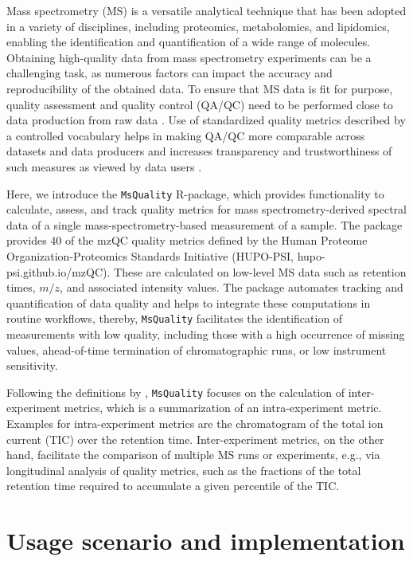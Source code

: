 \documentclass{bioinfo}
\begin{document}
Mass spectrometry (MS) is a versatile analytical technique that has been adopted
in a variety of disciplines, including proteomics, metabolomics, and lipidomics, 
enabling the identification and quantification of a wide range of molecules. 
Obtaining high-quality data from mass spectrometry experiments can be a 
challenging task, as numerous factors can impact the accuracy and 
reproducibility of the obtained data. To ensure that MS data is fit for purpose, 
quality assessment and quality control (QA/QC) need to be performed close
to data production from raw data \citep{Koecher2011,Bereman2015}. Use of standardized 
quality metrics described by a controlled vocabulary helps in making QA/QC more 
comparable across datasets and data producers and increases transparency and 
trustworthiness of such measures as viewed by data users 
\citep{Mayer2012,Mayer2013}.

Here, we introduce the \texttt{MsQuality} R-package, which provides 
functionality to calculate, assess, and track quality metrics for mass 
spectrometry-derived spectral data of a single mass-spectrometry-based 
measurement of a sample. 
The package provides 40 of the mzQC quality metrics defined by
the Human Proteome Organization-Proteomics Standards Initiative (HUPO-PSI,
hupo-psi.github.io/mzQC). These are calculated on low-level MS data
such as retention times, $m/z$, and associated intensity values.
The package automates tracking and quantification of data quality and 
helps to integrate these computations in routine workflows, thereby,
\texttt{MsQuality} facilitates the identification of measurements with low 
quality, including those with a high occurrence of missing values, 
ahead-of-time termination of chromatographic runs, or low instrument sensitivity.

Following the definitions by \cite{Bittremieux2017}, \texttt{MsQuality}
focuses on the calculation of inter-experiment metrics, which is a
summarization of an intra-experiment metric. Examples for
intra-experiment metrics are the chromatogram of the total ion current (TIC) 
over the retention time. Inter-experiment metrics, on the other hand, 
facilitate the comparison of multiple MS runs or experiments, 
e.g., via longitudinal analysis of quality metrics, such as the
fractions of the total retention time required to accumulate a given
percentile of the TIC.

\section{Usage scenario and implementation} \label{usagescenario}
\end{document}
